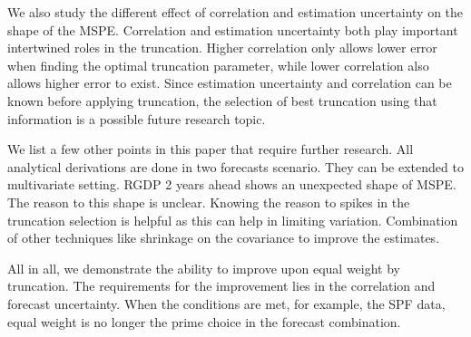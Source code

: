 \documentclass[11pt]{article}
\begin{document}
We also study the different effect of correlation and estimation uncertainty on the shape of the MSPE. Correlation and estimation uncertainty both play important intertwined roles in the truncation. Higher correlation only allows lower error when finding the optimal truncation parameter, while lower correlation also allows higher error to exist. Since estimation uncertainty and correlation can be known before applying truncation, the selection of best truncation using that information is a possible future research topic.

We list a few other points in this paper that require further research. All analytical derivations are done in two forecasts scenario. They can be extended to multivariate setting. 
RGDP 2 years ahead shows an unexpected shape of MSPE. The reason to this shape is unclear.
Knowing the reason to spikes in the truncation selection is helpful as this can help in limiting variation.
Combination of other techniques like shrinkage on the covariance to improve the estimates.

All in all, we demonstrate the ability to improve upon equal weight by truncation. The requirements for the improvement lies in the correlation and forecast uncertainty. When the conditions are met, for example, the SPF data, equal weight is no longer the prime choice in the forecast combination. 




\end{document}
